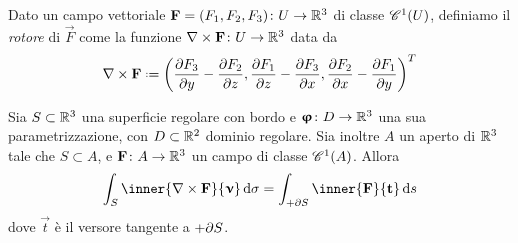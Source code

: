 Dato un campo vettoriale $\vec F=(F_1,F_2,F_3)\colon U\to\R^3$ di classe $\cont[1]{U}$, definiamo il \emph{rotore} di $\vec F$ come la funzione $\rot\vec F\colon U\to\R^3$ data da
\begin{equation}
	\rot\vec F\defeq\bigg(
		\drp{F_3}{y}-\drp{F_2}{z},
		\drp{F_1}{z}-\drp{F_3}{x},
		\drp{F_2}{x}-\drp{F_1}{y}
		\bigg)^T
\end{equation}
\begin{teorema} \label{t:rotore-R3}
	Sia $S\subset\R^3$ una superficie regolare con bordo e $\vphi\colon D\to\R^3$ una sua parametrizzazione, con $D\subset\R^2$ dominio regolare.
	Sia inoltre $A$ un aperto di $\R^3$ tale che $S\subset A$, e $\vec F\colon A\to\R^3$ un campo di classe $\cont[1]{A}$.
	Allora
	\begin{equation}
		\int_S\inner{\rot\vec F}{\vnu}\,\dd\sigma=\int_{+\boundary S}\inner{\vec F}{\vec t}\,\dd s
		\label{eq:rotore-R3}
	\end{equation}
	dove $\vec t$ è il versore tangente a $+\boundary S$.
\end{teorema}
